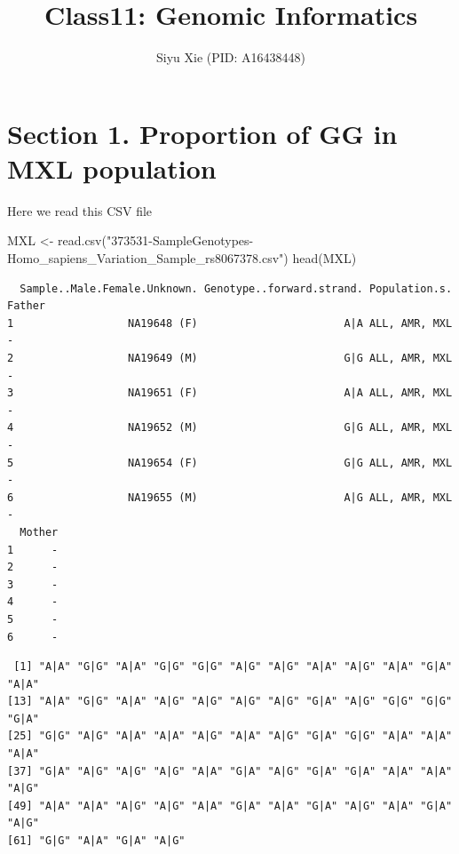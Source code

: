 \documentclass[
  letterpaper,
  DIV=11,
  numbers=noendperiod]{scrartcl}
\title{Class11: Genomic Informatics}
\author{Siyu Xie (PID: A16438448)}
\date{}
\newenvironment{Shaded}{\begin{snugshade}}{\end{snugshade}}
\newcommand{\FunctionTok}[1]{\textcolor[rgb]{0.28,0.35,0.67}{#1}}
\newcommand{\NormalTok}[1]{\textcolor[rgb]{0.00,0.23,0.31}{#1}}
\newcommand{\OtherTok}[1]{\textcolor[rgb]{0.00,0.23,0.31}{#1}}
\newcommand{\SpecialCharTok}[1]{\textcolor[rgb]{0.37,0.37,0.37}{#1}}
\newcommand{\StringTok}[1]{\textcolor[rgb]{0.13,0.47,0.30}{#1}}
\renewcommand*\contentsname{Table of contents}
\newcommand\contentsname{Table of contents}
\begin{document}
\maketitle

\renewcommand*\contentsname{Table of contents}
{
\hypersetup{linkcolor=}
\setcounter{tocdepth}{3}
\tableofcontents
}
\section{Section 1. Proportion of G\textbar G in MXL
population}\label{section-1.-proportion-of-gg-in-mxl-population}

Here we read this CSV file

\begin{Shaded}
\begin{Highlighting}[]
\NormalTok{MXL }\OtherTok{\textless{}{-}} \FunctionTok{read.csv}\NormalTok{(}\StringTok{"373531{-}SampleGenotypes{-}Homo\_sapiens\_Variation\_Sample\_rs8067378.csv"}\NormalTok{)}
\FunctionTok{head}\NormalTok{(MXL)}
\end{Highlighting}
\end{Shaded}

\begin{verbatim}
  Sample..Male.Female.Unknown. Genotype..forward.strand. Population.s. Father
1                  NA19648 (F)                       A|A ALL, AMR, MXL      -
2                  NA19649 (M)                       G|G ALL, AMR, MXL      -
3                  NA19651 (F)                       A|A ALL, AMR, MXL      -
4                  NA19652 (M)                       G|G ALL, AMR, MXL      -
5                  NA19654 (F)                       G|G ALL, AMR, MXL      -
6                  NA19655 (M)                       A|G ALL, AMR, MXL      -
  Mother
1      -
2      -
3      -
4      -
5      -
6      -
\end{verbatim}

\begin{Shaded}
\end{Shaded}

\begin{verbatim}
 [1] "A|A" "G|G" "A|A" "G|G" "G|G" "A|G" "A|G" "A|A" "A|G" "A|A" "G|A" "A|A"
[13] "A|A" "G|G" "A|A" "A|G" "A|G" "A|G" "A|G" "G|A" "A|G" "G|G" "G|G" "G|A"
[25] "G|G" "A|G" "A|A" "A|A" "A|G" "A|A" "A|G" "G|A" "G|G" "A|A" "A|A" "A|A"
[37] "G|A" "A|G" "A|G" "A|G" "A|A" "G|A" "A|G" "G|A" "G|A" "A|A" "A|A" "A|G"
[49] "A|A" "A|A" "A|G" "A|G" "A|A" "G|A" "A|A" "G|A" "A|G" "A|A" "G|A" "A|G"
[61] "G|G" "A|A" "G|A" "A|G"
\end{verbatim}
\end{document}
